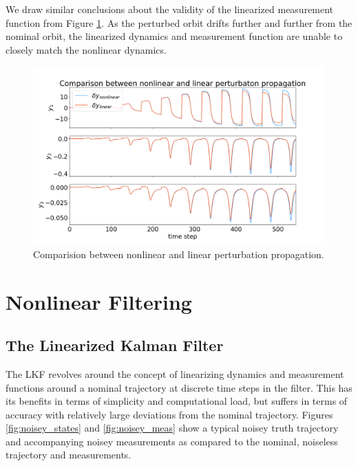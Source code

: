 \documentclass[11pt, a4paper]{article}
\begin{document}
We draw similar conclusions about the validity of the linearized measurement function from Figure \ref{fig:nlvl_m}.
As the perturbed orbit drifts further and further from the nominal orbit, the linearized dynamics and measurement function are unable to closely match the nonlinear dynamics. 

\begin{figure}[H]
	\centering
	\includegraphics[width=\textwidth]{./Figures/nonlvl_meas.png}
	\caption{Comparision between nonlinear and linear perturbation propagation.}
	\label{fig:nlvl_m}
\end{figure}


\section{Nonlinear Filtering}

\subsection{The Linearized Kalman Filter}
\label{sec: LKF}
The LKF revolves around the concept of linearizing dynamics and measurement functions around a nominal trajectory at discrete time steps in the filter. 
This has its benefits in terms of simplicity and computational load, but suffers in terms of accuracy with relatively large deviations from the nominal trajectory. 
Figures \ref{fig:noisey_states} and \ref{fig:noisey_meas} show a typical noisey truth trajectory and accompanying noisey measurements as compared to the nominal, noiseless trajectory and measurements.  
\end{document}
